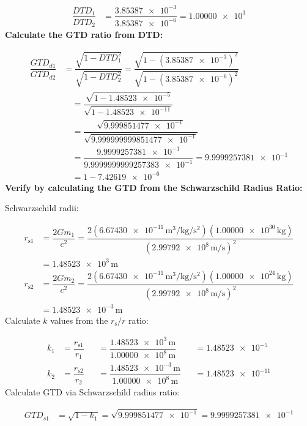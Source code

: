 \documentclass[twoside,twocolumn,9pt,fleqn]{article}
\begin{document}
\begin{mdframed}
\begin{align*}
\dfrac{DTD_1}{DTD_2} &= \dfrac{\num{3.85387e-3}}{\num{3.85387e-6}} = \num{1.00000e3}
\end{align*}
\noindent\textbf{Calculate the GTD ratio from DTD:}\par
\begin{align*}
\dfrac{GTD_{d1}}{GTD_{d2}} &= \dfrac{\sqrt{1-DTD_1^2}}{\sqrt{1-DTD_2^2}} = \dfrac{\sqrt{1-(\num{3.85387e-3})^2}}{\sqrt{1-(\num{3.85387e-6})^2}}\\
&\quad = \dfrac{\sqrt{1-\num{1.48523e-5}}}{\sqrt{1-\num{1.48523e-11}}}\\
&\quad = \dfrac{\sqrt{\num{9.999851477e-1}}}{\sqrt{\num{9.999999999851477e-1}}}\\
&\quad = \dfrac{\num{9.9999257381e-1}}{\num{9.9999999999257383e-1}} = \num{9.9999257381e-1}\\
&\quad = 1-\num{7.42619e-6}
\end{align*}
\noindent\textbf{Verify by calculating the GTD from the Schwarzschild Radius Ratio:}\par
\noindent Schwarzschild radii:\par
\begin{align*}
r_{\mathrm{s}1} &= \dfrac{2Gm_1}{c^2} = \dfrac{2(\num{6.67430e-11}\,\unit{\meter\cubed\per\kilogram\per\second\squared})(\num{1.00000e30}\,\unit{\kilogram})}{(\num{2.99792e8}\,\unit{\meter\per\second})^2}\\
&= \num{1.48523e3}\,\unit{\meter}\\
r_{\mathrm{s}2} &= \dfrac{2Gm_2}{c^2} = \dfrac{2(\num{6.67430e-11}\,\unit{\meter\cubed\per\kilogram\per\second\squared})(\num{1.00000e24}\,\unit{\kilogram})}{(\num{2.99792e8}\,\unit{\meter\per\second})^2}\\
&= \num{1.48523e-3}\,\unit{\meter}
\end{align*}
\noindent Calculate $k$ values from the $r_{\mathrm{s}}/r$ ratio:\par
\begin{align*}
k_1 &= \dfrac{r_{\mathrm{s}1}}{r_1} &&= \dfrac{\num{1.48523e3}\,\unit{\meter}}{\num{1.00000e8}\,\unit{\meter}} &&= \num{1.48523e-5}\\
k_2 &= \dfrac{r_{\mathrm{s}2}}{r_2} &&= \dfrac{\num{1.48523e-3}\,\unit{\meter}}{\num{1.00000e8}\,\unit{\meter}} &&= \num{1.48523e-11}
\end{align*}
\noindent Calculate GTD via Schwarzschild radius ratio:\par
\begin{align*}
GTD_{s1} &= \sqrt{1-k_1} = \sqrt{\num{9.999851477e-1}} = \num{9.9999257381e-1}\\

\end{align*}
\end{mdframed}
\end{document}
